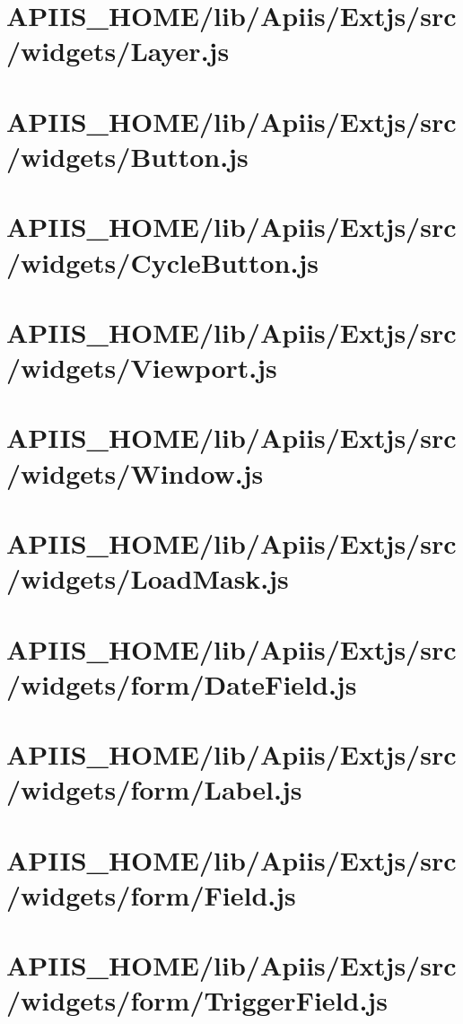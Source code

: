 \section{APIIS\_HOME/lib/Apiis/Extjs/src/widgets/Layer.js} 
\section{APIIS\_HOME/lib/Apiis/Extjs/src/widgets/Button.js} 
\section{APIIS\_HOME/lib/Apiis/Extjs/src/widgets/CycleButton.js} 
\section{APIIS\_HOME/lib/Apiis/Extjs/src/widgets/Viewport.js} 
\section{APIIS\_HOME/lib/Apiis/Extjs/src/widgets/Window.js} 
\section{APIIS\_HOME/lib/Apiis/Extjs/src/widgets/LoadMask.js} 
\section{APIIS\_HOME/lib/Apiis/Extjs/src/widgets/form/DateField.js} 
\section{APIIS\_HOME/lib/Apiis/Extjs/src/widgets/form/Label.js} 
\section{APIIS\_HOME/lib/Apiis/Extjs/src/widgets/form/Field.js} 
\section{APIIS\_HOME/lib/Apiis/Extjs/src/widgets/form/TriggerField.js} 
